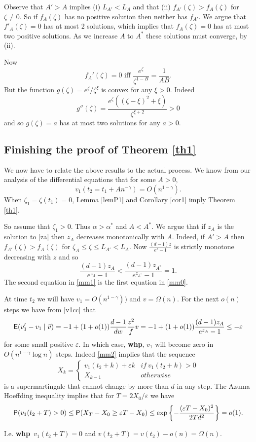 \documentclass[11pt]{article}
\def\a{\alpha}
\def\e{\varepsilon}
\def\g{\gamma}
\def\z{\zeta}
\def\whp{{\bf whp}}
\newcommand{\set}[1]{\left\{#1\right\}}
\def\E{{\sf E}}
\def\Pr{{\sf P}}
\def\vv{\vec{v}}
\newcommand{\beq}[1]{\begin{equation}\label{#1}}
\newcommand{\eeq}{\end{equation}}
\begin{document}
Observe that $A'>A$ implies 
(i) $L_{A'}<L_A$ and that (ii) $f_{A'}(\z)>f_A(\z)$ for $\z\neq 0$. So if $f_A(\z)$ has no positive solution
then neither has $f_{A'}$. We argue that $f'_A(\z)=0$ has at most 2 solutions, which implies that $f_A(\z)=0$ has at most two 
positive solutions. As we increase $A$ to $A^*$ these solutions must converge, by (ii).

Now 
$$f_A'(\z)=0\text{ iff }\frac{e^\z}{\z^{1-B}}=\frac{1}{AB}.$$
But the function $g(\z)=e^\z/\z^\xi$ is convex for any $\xi>0$. Indeed
$$g''(\z)=\frac{e^\z((\z-\xi)^2+\xi)}{\z^{\xi+2}}>0$$
and so $g(\z)=a$ has at most two solutions for any $a>0$.
\subsection{Finishing the proof of Theorem \ref{th1}}
We now have to relate the above results to the actual process. We know from our analysis of the differential equations that
for some $A>0$,
$$v_1(t_2=t_1+An^{-\g})=O(n^{1-\g}).$$
When $\z_1=\z(t_1)=0$, Lemma \ref{lemP1} and Corollary \ref{cor1} imply Theorem \ref{th1}.

So assume that $\z_1>0$. Thus $\a>\a^*$ and $A<A^*$.
We argue that if $z_A$ is the solution to \eqref{za} then $z_A$ decreases monotonically with $A$.
Indeed, if $A'>A$ then $f_{A'}(\z)>f_A(\z)$ for $\z_A\leq \z\leq L_{A'}<L_A$.
Now $\frac{(d-1)z}{e^z-1}$ is strictly monotone decreasing with $z$ and so 
\beq{mm1}
\frac{(d-1)z_A}{e^{z_A}-1}<\frac{(d-1)z_{A^*}}{e^{z_{A^*}}-1}=1.
\eeq
The second equation in \eqref{mm1} is the first equation in \eqref{mm0}.

At time $t_2$ we will have $v_1=O(n^{1-\g}))$ and $v=\Omega(n)$. For the next $o(n)$ steps
we have from \eqref{v1cc} that
\beq{mm2}
\E(v_1'-v_1\mid \vv)=-1+(1+o(1))\frac{d-1}{dw}\frac{z^2}{f}v=-1+(1+o(1))\frac{(d-1)z_A}{e^{z_A}-1}\leq -\e
\eeq
for some small positive $\e$. In which case, \whp, $v_1$ will become zero in $O(n^{1-\g}\log n)$ steps.
Indeed \eqref{mm2} implies that the sequence
$$X_k=\begin{cases}v_1(t_2+k)+\e k&if\ v_1(t_2+k)>0\\X_{k-1}&otherwise\end{cases}$$
is a supermartingale that cannot change by
more than $d$ in any step. The Azuma-Hoeffding inequality implies that for $T=2X_0/\e$ we have
$$\Pr(v_1(t_2+T)>0)\leq \Pr(X_T-X_0\geq \e T-X_0)\leq \exp\set{-\frac{(\e T-X_0)^2}{2Td^2}}=o(1).$$
 
I.e. \whp\ $v_1(t_2+T)=0$ and $v(t_2+T)=v(t_2)-o(n)=\Omega(n)$.
\end{document}
